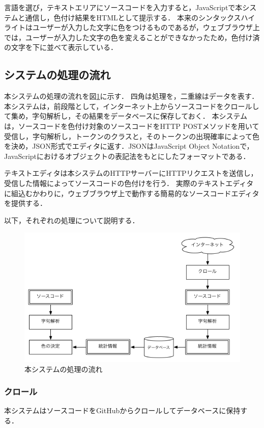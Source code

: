 \documentclass{cs-thesis}
\begin{document}
  言語を選び，テキストエリアにソースコードを入力すると，JavaScriptで本システムと通信し，色付け結果をHTMLとして提示する．
  本来のシンタックスハイライトはユーザーが入力した文字に色をつけるものであるが，ウェブブラウザ上では，ユーザーが入力した文字の色を変えることができなかったため，色付け済の文字を下に並べて表示している．

  \subsection{システムの処理の流れ}
  本システムの処理の流れを図\ref{flow}に示す．
  四角は処理を，二重線はデータを表す．
  本システムは，前段階として，インターネット上からソースコードをクロールして集め，字句解析し，その結果をデータベースに保存しておく．
  本システムは，ソースコードを色付け対象のソースコードをHTTP POSTメソッドを用いて受信し，字句解析し，トークンのクラスと，そのトークンの出現確率によって色を決め，JSON形式でエディタに返す．JSONはJavaScript Object Notationで，JavaScriptにおけるオブジェクトの表記法をもとにしたフォーマットである．

  テキストエディタは本システムのHTTPサーバーにHTTPリクエストを送信し，受信した情報によってソースコードの色付けを行う．
  実際のテキストエディタに組込むかわりに，ウェブブラウザ上で動作する簡易的なソースコードエディタを提供する．

  以下，それぞれの処理について説明する．

  \begin{figure}[htbp]
   \centering
   \includegraphics[scale=0.8]{flow.png}
   \caption{本システムの処理の流れ}
   \label{flow}
  \end{figure}

  \clearpage
  \subsubsection{クロール}
  本システムはソースコードをGitHubからクロールしてデータベースに保持する．
\end{document}
